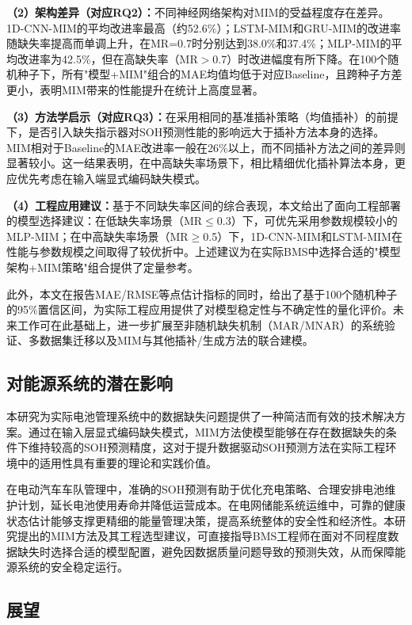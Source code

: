 \documentclass[10pt,a4paper]{ctexart}
\begin{document}
\textbf{（2）架构差异（对应RQ2）：}不同神经网络架构对MIM的受益程度存在差异。1D-CNN-MIM的平均改进率最高（约52.6\%）；LSTM-MIM和GRU-MIM的改进率随缺失率提高而单调上升，在MR=0.7时分别达到38.0\%和37.4\%；MLP-MIM的平均改进率为42.5\%，但在高缺失率（MR$>$0.7）时改进幅度有所下降。在100个随机种子下，所有"模型+MIM"组合的MAE均值均低于对应Baseline，且跨种子方差更小，表明MIM带来的性能提升在统计上高度显著。

\textbf{（3）方法学启示（对应RQ3）：}在采用相同的基准插补策略（均值插补）的前提下，是否引入缺失指示器对SOH预测性能的影响远大于插补方法本身的选择。MIM相对于Baseline的MAE改进率一般在26\%以上，而不同插补方法之间的差异则显著较小。这一结果表明，在中高缺失率场景下，相比精细优化插补算法本身，更应优先考虑在输入端显式编码缺失模式。

\textbf{（4）工程应用建议：}基于不同缺失率区间的综合表现，本文给出了面向工程部署的模型选择建议：在低缺失率场景（MR$\leq$0.3）下，可优先采用参数规模较小的MLP-MIM；在中高缺失率场景（MR$\geq$0.5）下，1D-CNN-MIM和LSTM-MIM在性能与参数规模之间取得了较优折中。上述建议为在实际BMS中选择合适的"模型架构+MIM策略"组合提供了定量参考。

此外，本文在报告MAE/RMSE等点估计指标的同时，给出了基于100个随机种子的95\%置信区间，为实际工程应用提供了对模型稳定性与不确定性的量化评价。未来工作可在此基础上，进一步扩展至非随机缺失机制（MAR/MNAR）的系统验证、多数据集迁移以及MIM与其他插补/生成方法的联合建模。

\subsection{对能源系统的潜在影响}

本研究为实际电池管理系统中的数据缺失问题提供了一种简洁而有效的技术解决方案。通过在输入层显式编码缺失模式，MIM方法使模型能够在存在数据缺失的条件下维持较高的SOH预测精度，这对于提升数据驱动SOH预测方法在实际工程环境中的适用性具有重要的理论和实践价值。

在电动汽车车队管理中，准确的SOH预测有助于优化充电策略、合理安排电池维护计划，延长电池使用寿命并降低运营成本。在电网储能系统运维中，可靠的健康状态估计能够支撑更精细的能量管理决策，提高系统整体的安全性和经济性。本研究提出的MIM方法及其工程选型建议，可直接指导BMS工程师在面对不同程度数据缺失时选择合适的模型配置，避免因数据质量问题导致的预测失效，从而保障能源系统的安全稳定运行。

\subsection{展望}
\end{document}
